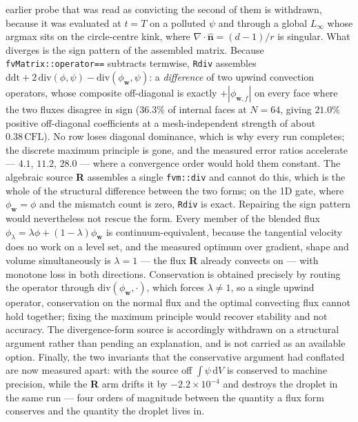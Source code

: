 \documentclass[preprint,3p,11pt]{elsarticle}
\newcommand{\psilev}{\psi}
\newcommand{\nhat}{\hat{\mathbf{n}}}
\begin{document}
earlier probe that was read as convicting the second of them is withdrawn, because
it was evaluated at $t=T$ on a polluted $\psilev$ and through a global $L_\infty$
whose argmax sits on the circle-centre kink, where $\nabla\cdot\nhat = (d-1)/r$ is
singular. What diverges is the sign pattern of the assembled matrix. Because
\texttt{fvMatrix::operator==} subtracts termwise, \texttt{Rdiv} assembles
$\mathrm{ddt} + 2\,\mathrm{div}(\phi,\psilev) -
\mathrm{div}(\phi_{\mathbf{w}},\psilev)$: a \emph{difference} of two upwind
convection operators, whose composite off-diagonal is exactly
$+|\phi_{\mathbf{w},f}|$ on every face where the two fluxes disagree in sign
($36.3\%$ of internal faces at $N=64$, giving $21.0\%$ positive off-diagonal
coefficients at a mesh-independent strength of about $0.38\,\mathrm{CFL}$). No row
loses diagonal dominance, which is why every run completes; the discrete maximum
principle is gone, and the measured error ratios accelerate --- $4.1$, $11.2$,
$28.0$ --- where a convergence order would hold them constant. The algebraic source
\textbf{R} assembles a single \texttt{fvm::div} and cannot do this, which is the
whole of the structural difference between the two forms; on the 1D gate, where
$\phi_{\mathbf{w}} = \phi$ and the mismatch count is zero, \texttt{Rdiv} is exact.
Repairing the sign pattern would nevertheless not rescue the form. Every member of
the blended flux $\phi_\lambda = \lambda\phi + (1-\lambda)\phi_{\mathbf{w}}$ is
continuum-equivalent, because the tangential velocity does no work on a level set,
and the measured optimum over gradient, shape and volume simultaneously is
$\lambda = 1$ --- the flux \textbf{R} already convects on --- with monotone loss in
both directions. Conservation is obtained precisely by routing the operator through
$\mathrm{div}(\phi_{\mathbf{w}},\cdot)$, which forces $\lambda \neq 1$, so a
single upwind operator, conservation on the normal flux and the optimal convecting
flux cannot hold together; fixing the maximum principle would recover stability and
not accuracy. The divergence-form source is accordingly withdrawn on a structural
argument rather than pending an explanation, and is not carried as an available
option. Finally,
the two invariants that the conservative argument had conflated are now measured
apart: with the source off $\int\psilev\,\mathrm dV$ is conserved to machine
precision, while the \textbf{R} arm drifts it by $-2.2\times10^{-4}$ and destroys
the droplet in the same run --- four orders of magnitude between the quantity a
flux form conserves and the quantity the droplet lives in.
\end{document}
